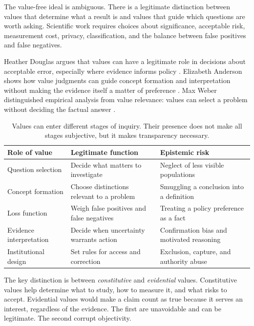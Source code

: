 The value-free ideal is ambiguous. There is a legitimate distinction between
values that determine what a result is and values that guide which questions
are worth asking. Scientific work requires choices about significance,
acceptable risk, measurement cost, privacy, classification, and the balance
between false positives and false negatives.

Heather Douglas argues that values can have a legitimate role in decisions
about acceptable error, especially where evidence informs policy
\citep{douglas2009}. Elizabeth Anderson shows how value judgments can guide
concept formation and interpretation without making the evidence itself a
matter of preference \citep{anderson2004}. Max Weber distinguished empirical
analysis from value relevance: values can select a problem without deciding
the factual answer \citep{weber1949}.

\begin{table}[ht]
\centering
\smalltable
\begin{tabularx}{\textwidth}{p{}YY}
\toprule
Role of value & Legitimate function & Epistemic risk\\
\midrule
Question selection & Decide what matters to investigate & Neglect of less visible populations\\
Concept formation & Choose distinctions relevant to a problem & Smuggling a conclusion into a definition\\
Loss function & Weigh false positives and false negatives & Treating a policy preference as a fact\\
Evidence interpretation & Decide when uncertainty warrants action & Confirmation bias and motivated reasoning\\
Institutional design & Set rules for access and correction & Exclusion, capture, and authority abuse\\
\bottomrule
\end{tabularx}
\caption{Values can enter different stages of inquiry. Their presence does not
make all stages subjective, but it makes transparency necessary.}
\label{tab:values}
\end{table}

The key distinction is between \emph{constitutive} and \emph{evidential}
values. Constitutive values help determine what to study, how to measure it,
and what risks to accept. Evidential values would make a claim count as true
because it serves an interest, regardless of the evidence. The first are
unavoidable and can be legitimate. The second corrupt objectivity.

